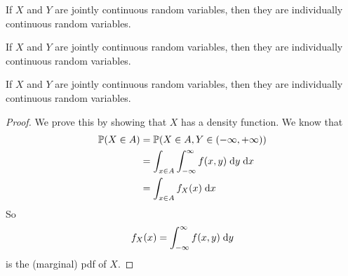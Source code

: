 \begin{note}
  \begin{field}
    \begin{thm}
      If $X$ and $Y$ are jointly continuous random variables, then they are individually continuous random variables.
    \end{thm}
  \end{field}
  \begin{field}
    \begin{thm}
      If $X$ and $Y$ are jointly continuous random variables, then they are individually continuous random variables.
    \end{thm}
  \end{field}
  \xplain{}%
\end{note}

%
\begin{note}
  \begin{field}
    \begin{thm}
      If $X$ and $Y$ are jointly continuous random variables, then they are individually continuous random variables.
    \end{thm}
  \end{field}
  \begin{field}
    \begin{proof}
      We prove this by showing that $X$ has a density function.
      We know that
      \begin{align*}
        \mathbb{P}(X \in A) &= \mathbb{P}(X \in A, Y\in (-\infty, +\infty))\\
        &= \int_{x\in A}\int_{-\infty}^\infty f(x, y)\;\mathrm{d} y\;\mathrm{d} x\\
        &= \int_{x\in A} f_X(x)\;\mathrm{d} x
      \end{align*}
      So
      \[
        f_X(x) = \int_{-\infty}^\infty f(x, y)\;\mathrm{d} y
      \]
      is the (marginal) pdf of $X$.
    \end{proof}
  \end{field}
  \xplain{}%
\end{note}

